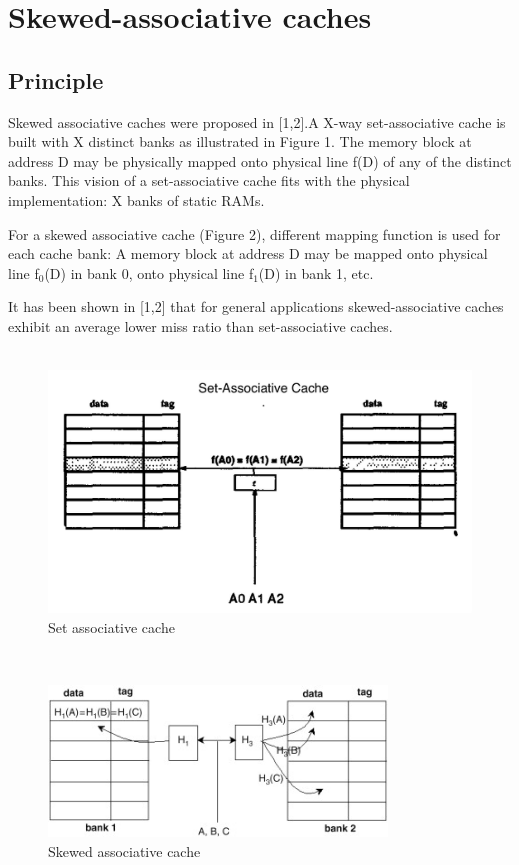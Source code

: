\documentclass{article}
\begin{document}
\section{Skewed-associative caches}
\subsection{Principle}
Skewed associative caches were proposed in [1,2].A X-way
set-associative cache is built with X distinct banks as
illustrated in Figure 1. The memory block at address D may be
physically mapped onto physical line f(D) of any of the
distinct banks. This vision of a set-associative cache fits
with the physical implementation: X banks of static RAMs.

\qquad For a skewed associative cache (Figure 2),
different mapping function is used for each cache bank:
A memory block at address D may be mapped onto physical
line f$_0$(D) in bank 0, onto physical line
f$_1$(D) in bank 1, etc.

\qquad It has been shown in [1,2] that for general applications
skewed-associative caches exhibit an average lower miss ratio than
set-associative caches.
\\\\
\begin{figure}
    \centering
    \includegraphics[width=12cm\textwidth,center]{image set associative.jpeg}
    \caption{Set associative cache}
    \label{fig:my_label}
\end{figure}
\\
\begin{figure}
    \centering
    \includegraphics[width=9cm]{image hash.jpg}
    \caption{Skewed associative cache}
    \label{fig:my_label}
\end{figure}
\end{document}
